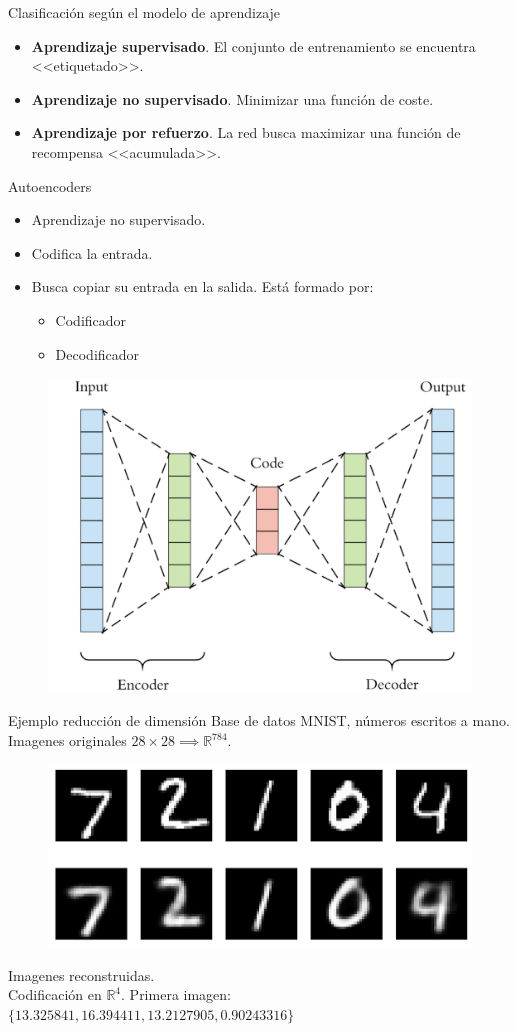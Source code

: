 \documentclass[spanish]{beamer}
\begin{document}
\begin{frame}{Clasificación según el modelo de aprendizaje}
\begin{itemize}
  \item \textbf{Aprendizaje supervisado}. El conjunto de entrenamiento se
    encuentra <<etiquetado>>.
  \item \textbf{Aprendizaje no supervisado}. Minimizar una función de coste.
  \item \textbf{Aprendizaje por refuerzo}. La red busca maximizar una función de
    recompensa <<acumulada>>.
\end{itemize}
\end{frame}

\begin{frame}{Autoencoders}
\begin{itemize}
\item Aprendizaje no supervisado.
\item Codifica la entrada.
\item Busca copiar su entrada en la salida. Está formado por:
  \begin{itemize}
    \item Codificador
    \item Decodificador
  \end{itemize}
\end{itemize}
\begin{figure}[h]
  \centering
  \includegraphics[width=.6\textwidth]{img/autoencoder}
\end{figure}
\end{frame}

\begin{frame}{Ejemplo reducción de dimensión}
    Base de datos MNIST, números escritos a mano.\\
  Imagenes originales $28\times28 \implies \mathbb{R}^{784}$.
\begin{figure}[h]
  \includegraphics[width=.6\textwidth]{img/autoencoder_ex1}
\end{figure}
Imagenes reconstruidas.\\

Codificación en $\mathbb{R}^4$. Primera imagen: $\{13.325841, 16.394411, 13.2127905, 0.90243316\}$
\end{frame}
\end{document}
